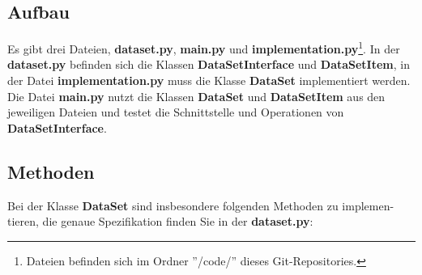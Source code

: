 \documentclass{scrartcl}
\begin{document}
        \subsection{Aufbau}

            Es gibt drei Dateien, \textbf{dataset.py}, \textbf{main.py} und \textbf{implementation.py}\footnote[1]{Dateien befinden sich im Ordner ''/code/'' dieses Git-Repositories.}. In der
            \textbf{dataset.py} befinden sich die Klassen \textbf{DataSetInterface} und \textbf{DataSetItem},
            in der Datei \textbf{implementation.py} muss die Klasse \textbf{DataSet} implementiert
            werden. Die Datei \textbf{main.py} nutzt die Klassen \textbf{DataSet} und \textbf{DataSetItem}
            aus den jeweiligen Dateien und testet die Schnittstelle und Operationen von
            \textbf{DataSetInterface}.

        \subsection{Methoden}

            Bei der Klasse \textbf{DataSet} sind insbesondere folgenden Methoden zu implemen-
            tieren, die genaue Spezifikation finden Sie in der \textbf{dataset.py}:
            
\end{document}
